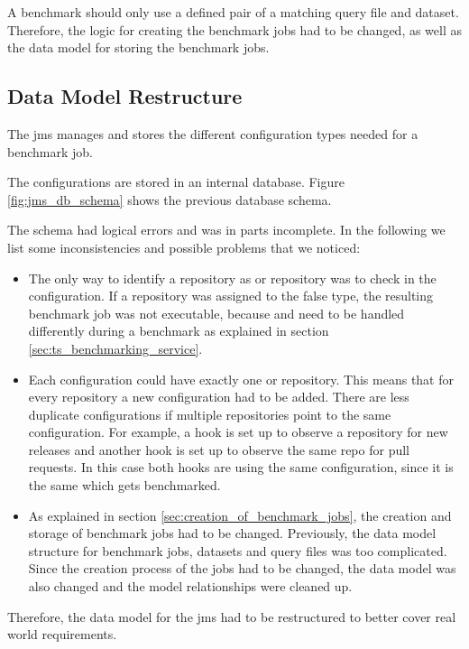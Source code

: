 A benchmark should only use a defined pair of a matching query file and dataset.
Therefore, the logic for creating the benchmark jobs had to be changed, as well as the data model for storing the benchmark jobs.


\subsection{Data Model Restructure}
\label{sec:review_data_model}
The \ac{jms} manages and stores the different configuration types needed for a benchmark job.

The configurations are stored in an internal database.
Figure \ref{fig:jms_db_schema} shows the previous database schema.

The schema had logical errors and was in parts incomplete.
In the following we list some inconsistencies and possible problems that we noticed:
\begin{itemize}
	\item The only way to identify a repository as \gh{} or \dockh{} repository was to check in the \ts{} configuration.
		If a repository was assigned to the false type, the resulting benchmark job was not executable, because \gh{} and \dockh{} need to be handled differently during a benchmark as explained in section \ref{sec:ts_benchmarking_service}.
	
	\item Each \ts{} configuration could have exactly one \gh{} or \dockh{} repository.
		This means that for every repository a new \ts{} configuration had to be added.
		There are less duplicate configurations if multiple repositories point to the same configuration.
		For example, a hook is set up to observe a \gh{} repository for new releases and another hook is set up to observe the same \gh{} repo for pull requests.
		In this case both hooks are using the same \ts{} configuration, since it is the same \ts{} which gets benchmarked.
		
	\item As explained in section \ref{sec:creation_of_benchmark_jobs}, the creation and storage of benchmark jobs had to be changed.
		Previously, the data model structure for benchmark jobs, datasets and query files was too complicated.
		Since the creation process of the jobs had to be changed, the data model was also changed and the model relationships were cleaned up.
	
\end{itemize} 

Therefore, the data model for the \ac{jms} had to be restructured to better cover real world requirements.


